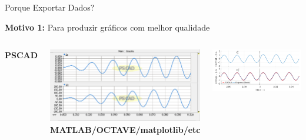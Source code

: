 





\begin{frame}{Porque Exportar Dados?}
\centering


\textbf{Motivo 1:} Para produzir gráficos com melhor qualidade 
\vspace*{1cm}

\begin{columns}

\centering
\textbf{PSCAD}
\vspace*{0.5cm}

\includegraphics[width=0.90\linewidth]{./figuras/Exportacao/ex_pscadfig}
\centering
\textbf{MATLAB/OCTAVE/matplotlib/etc}
\vspace*{0.5cm}

\includegraphics[width=0.90\linewidth]{./figuras/Exportacao/ex_matlab}

\end{columns}

\end{frame}





